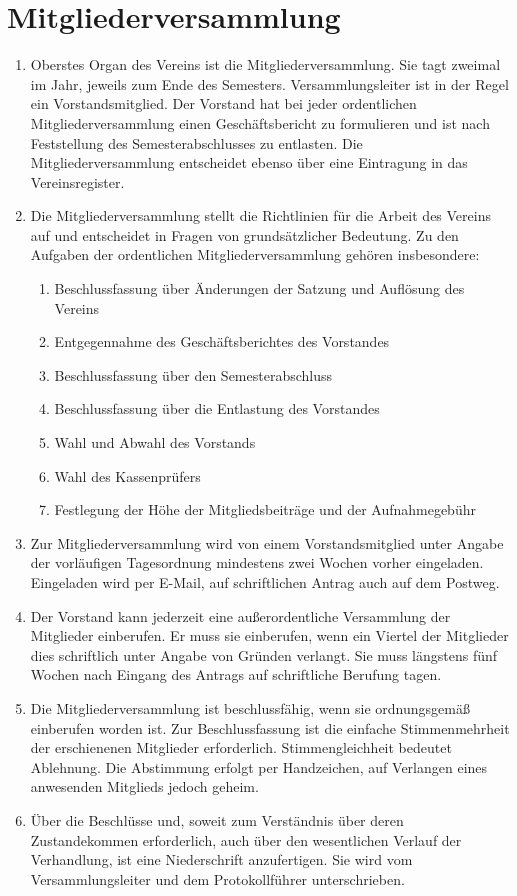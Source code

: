 \documentclass{article}
\begin{document}
\section{Mitgliederversammlung}
\label{sec:mitgliederversammlung}
\begin{enumerate}
	\item Oberstes Organ des Vereins ist die Mitgliederversammlung. Sie tagt zweimal im Jahr, jeweils zum Ende des Semesters. Versammlungsleiter ist in der Regel ein Vorstandsmitglied. Der Vorstand hat bei jeder ordentlichen Mitgliederversammlung einen Geschäftsbericht zu formulieren und ist nach Feststellung des Semesterabschlusses zu entlasten. Die Mitgliederversammlung entscheidet ebenso über eine Eintragung in das  Vereinsregister.
	\item Die Mitgliederversammlung stellt die Richtlinien für die Arbeit des Vereins auf und  entscheidet in Fragen von grundsätzlicher Bedeutung. Zu den Aufgaben der  ordentlichen Mitgliederversammlung gehören insbesondere:
	\begin{enumerate}
		\item Beschlussfassung über Änderungen der Satzung und Auflösung des Vereins
		\item Entgegennahme des Geschäftsberichtes des Vorstandes
		\item Beschlussfassung über den Semesterabschluss
		\item Beschlussfassung über die Entlastung des Vorstandes
		\item Wahl und Abwahl des Vorstands
		\item Wahl des Kassenprüfers
		\item Festlegung der Höhe der Mitgliedsbeiträge und der Aufnahmegebühr
	\end{enumerate}
	\item Zur Mitgliederversammlung wird von einem Vorstandsmitglied unter Angabe der  vorläufigen Tagesordnung mindestens zwei Wochen vorher eingeladen. Eingeladen
 wird per E-Mail, auf schriftlichen Antrag auch auf dem Postweg.
 \item Der Vorstand kann jederzeit eine außerordentliche Versammlung der Mitglieder  einberufen. Er muss sie einberufen, wenn ein Viertel der Mitglieder dies schriftlich  unter Angabe von Gründen verlangt. Sie muss längstens fünf Wochen nach Eingang  des Antrags auf schriftliche Berufung tagen.
 \item Die Mitgliederversammlung ist beschlussfähig, wenn sie ordnungsgemäß einberufen worden ist. Zur Beschlussfassung ist die einfache Stimmenmehrheit der erschienenen Mitglieder erforderlich. Stimmengleichheit bedeutet Ablehnung. Die Abstimmung erfolgt per Handzeichen, auf Verlangen eines anwesenden Mitglieds jedoch geheim.
 \item Über die Beschlüsse und, soweit zum Verständnis über deren Zustandekommen  erforderlich, auch über den wesentlichen Verlauf der Verhandlung, ist eine Niederschrift anzufertigen. Sie wird vom Versammlungsleiter und dem Protokollführer unterschrieben.
\end{enumerate}
\end{document}
